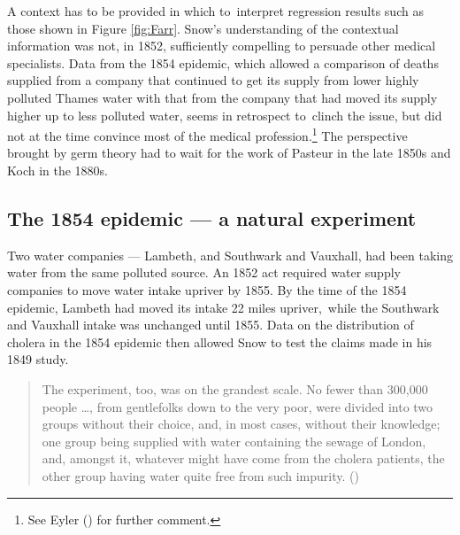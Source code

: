 \documentclass[
  10ptls,
  b5paper]{book}
\begin{document}
A context has to be provided in which to~interpret regression results such as those shown in Figure \ref{fig:Farr}. Snow's understanding of the contextual information was not, in 1852, sufficiently compelling to persuade other medical specialists. Data from the 1854 epidemic, which allowed a comparison of deaths supplied from a company that continued to get its supply from lower highly polluted Thames water with that from the company that had moved its supply higher up to less polluted water, seems in retrospect to~clinch the issue, but did not at the time convince most of the medical profession.\footnote{See Eyler () for further comment.} The perspective brought by germ theory had to wait for the work of Pasteur in the late 1850s and Koch in the 1880s.

\subsection*{The 1854 epidemic --- a natural experiment}\label{the-1854-epidemic-a-natural-experiment}

Two water companies --- Lambeth, and Southwark and Vauxhall, had been taking water from the same polluted source. An 1852 act required water supply companies to move water intake upriver by 1855. By the time of the 1854 epidemic, Lambeth had moved its intake 22 miles upriver,~while the Southwark and Vauxhall intake was unchanged until 1855. Data on the distribution of cholera in the 1854 epidemic then allowed Snow to test the claims made in his 1849 study.


\begin{quote}
The experiment, too, was on the grandest scale. No fewer than 300,000 people \ldots, from gentlefolks down to the very poor, were divided into two groups without their choice, and, in most cases, without their knowledge; one group being supplied with water containing the sewage of London, and, amongst it, whatever might have come from the cholera patients, the other group having water quite free from such impurity. ()
\end{quote}
\end{document}
